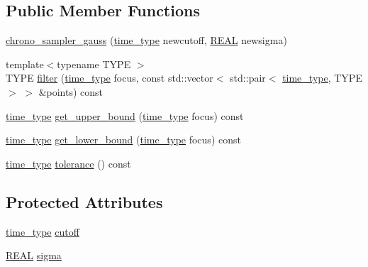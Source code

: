 \subsection*{Public Member Functions}
\begin{DoxyCompactItemize}
\item 
\hyperlink{classmui_1_1chrono__sampler__gauss_a0f89e81a457ebb15623fc4d0ad25cea5}{chrono\+\_\+sampler\+\_\+gauss} (\hyperlink{classmui_1_1chrono__sampler__gauss_accb8778472734fd419da15b26e087a41}{time\+\_\+type} newcutoff, \hyperlink{classmui_1_1chrono__sampler__gauss_acb55ad8350ad77bd80ea3979bc01f7a5}{R\+E\+AL} newsigma)
\item 
{\footnotesize template$<$typename T\+Y\+PE $>$ }\\T\+Y\+PE \hyperlink{classmui_1_1chrono__sampler__gauss_a6757bf02147d08582cc5f16910ac3a91}{filter} (\hyperlink{classmui_1_1chrono__sampler__gauss_accb8778472734fd419da15b26e087a41}{time\+\_\+type} focus, const std\+::vector$<$ std\+::pair$<$ \hyperlink{classmui_1_1chrono__sampler__gauss_accb8778472734fd419da15b26e087a41}{time\+\_\+type}, T\+Y\+PE $>$ $>$ \&points) const
\item 
\hyperlink{classmui_1_1chrono__sampler__gauss_accb8778472734fd419da15b26e087a41}{time\+\_\+type} \hyperlink{classmui_1_1chrono__sampler__gauss_a8fb552103746c9a1d430dbb6125eadd3}{get\+\_\+upper\+\_\+bound} (\hyperlink{classmui_1_1chrono__sampler__gauss_accb8778472734fd419da15b26e087a41}{time\+\_\+type} focus) const
\item 
\hyperlink{classmui_1_1chrono__sampler__gauss_accb8778472734fd419da15b26e087a41}{time\+\_\+type} \hyperlink{classmui_1_1chrono__sampler__gauss_aea11a50917c7bae0a75b9b4fafc31911}{get\+\_\+lower\+\_\+bound} (\hyperlink{classmui_1_1chrono__sampler__gauss_accb8778472734fd419da15b26e087a41}{time\+\_\+type} focus) const
\item 
\hyperlink{classmui_1_1chrono__sampler__gauss_accb8778472734fd419da15b26e087a41}{time\+\_\+type} \hyperlink{classmui_1_1chrono__sampler__gauss_ad19e8fc5d18b5568ab4c8f52fe518336}{tolerance} () const
\end{DoxyCompactItemize}
\subsection*{Protected Attributes}
\begin{DoxyCompactItemize}
\item 
\hyperlink{classmui_1_1chrono__sampler__gauss_accb8778472734fd419da15b26e087a41}{time\+\_\+type} \hyperlink{classmui_1_1chrono__sampler__gauss_a279b7de2f573d7a6f7316b4748eb3ec4}{cutoff}
\item 
\hyperlink{classmui_1_1chrono__sampler__gauss_acb55ad8350ad77bd80ea3979bc01f7a5}{R\+E\+AL} \hyperlink{classmui_1_1chrono__sampler__gauss_a10b2a032bbbebecf559a0fe3fbf92714}{sigma}
\end{DoxyCompactItemize}


